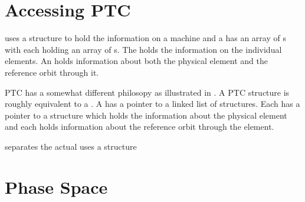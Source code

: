 \section{Accessing PTC}
\label{s:ptc.structures}

\bmad uses a  structure to hold the information on a
machine and a  has an array of s with
each  holding an array of s. The
 holds the information on the individual elements. An
 holds information about both the physical element and
the reference orbit through it.

PTC has a somewhat different philosopy as illustrated in
. A PTC  structure is roughly equivalent
to a \bmad {}. A  has a pointer to a linked
list of  structures. Each  has a pointer to a
 structure which holds the information about the physical
element and each  holds information about the reference
orbit through the element.

separates the actual uses
a  structure

\section{Phase Space}
\label{s:ptc.space}

